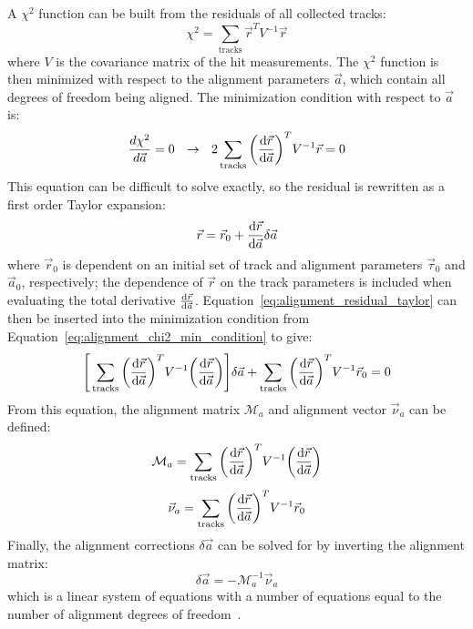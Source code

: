 A $\chi^2$ function can be built from the residuals of all collected tracks:
\begin{equation}
  \chi^2 = \sum\limits_{\textrm{tracks}}\vec{r}^{T}V^{-1}\vec{r}
  \label{eq:alignment_chi2}
\end{equation}
where $V$ is the covariance matrix of the hit measurements.
The $\chi^2$ function is then minimized with respect to the alignment parameters $\vec{a}$, which contain all degrees of freedom being aligned.
The minimization condition with respect to $\vec{a}$ is:
\begin{equation}
  \frac{d\chi^2}{d\vec{a}} = 0 ~~ \rightarrow ~~ 2\sum\limits_{\textrm{tracks}}\bigg(\deriv{\vec{r}}{\vec{a}}\bigg)^{T}V^{-1}\vec{r} = 0
  \label{eq:alignment_chi2_min_condition}
\end{equation}
This equation can be difficult to solve exactly, so the residual is rewritten as a first order Taylor expansion:
\begin{equation}
  \vec{r} = \vec{r}_0+\deriv{\vec{r}}{\vec{a}}\delta\vec{a}
  \label{eq:alignment_residual_taylor}
\end{equation}
where $\vec{r}_0$ is dependent on an initial set of track and alignment parameters $\vec{\tau}_0$ and $\vec{a}_0$, respectively; the dependence of $\vec{r}$ on the track parameters is included when evaluating the total derivative $\frac{\textrm{d}\vec{r}}{\textrm{d}\vec{a}}$.
Equation~\ref{eq:alignment_residual_taylor} can then be inserted into the minimization condition from Equation~\ref{eq:alignment_chi2_min_condition} to give:
\begin{equation}
  \Bigg[ \sum\limits_{\textrm{tracks}}\bigg(\deriv{\vec{r}}{\vec{a}}\bigg)^{T}V^{-1}\bigg(\deriv{\vec{r}}{\vec{a}}\bigg) \Bigg]\delta\vec{a} + \sum\limits_{\textrm{tracks}}\bigg(\deriv{\vec{r}}{\vec{a}}\bigg)^{T}V^{-1}\vec{r}_0 = 0
  \label{eq:alignment_chi2_min_taylor}
\end{equation}
From this equation, the alignment matrix $\mathcal{M}_a$ and alignment vector $\vec{\nu}_a$ can be defined:
\begin{equation}
  \mathcal{M}_a = \sum\limits_{\textrm{tracks}}\bigg(\deriv{\vec{r}}{\vec{a}}\bigg)^{T}V^{-1}\bigg(\deriv{\vec{r}}{\vec{a}}\bigg)
  \label{eq:alignment_matrix}
\end{equation}
\begin{equation}
  \vec{\nu}_a = \sum\limits_{\textrm{tracks}}\bigg(\deriv{\vec{r}}{\vec{a}}\bigg)^{T}V^{-1}\vec{r}_0
  \label{eq:alignment_vector}
\end{equation}
Finally, the alignment corrections $\delta\vec{a}$ can be solved for by inverting the alignment matrix:
\begin{equation}
  \delta\vec{a} = -\mathcal{M}_a^{-1}\vec{\nu}_a
  \label{eq:alignment_corrections}
\end{equation}
which is a linear system of equations with a number of equations equal to the number of alignment degrees of freedom~\cite{2011.alignment-7tev}.

